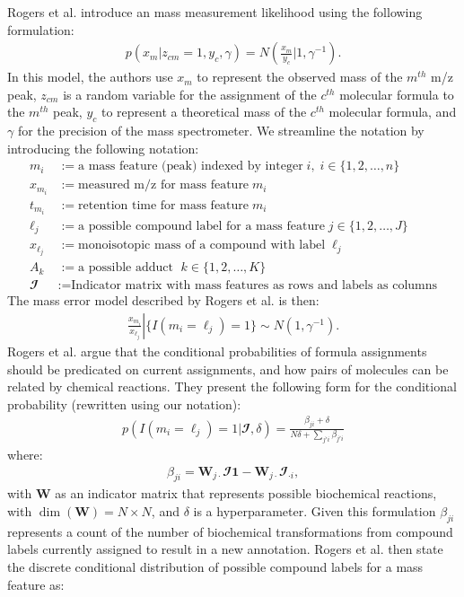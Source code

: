 \begin{DoubleSpace*}
Rogers et al. introduce an mass measurement likelihood using the following formulation:
\begin{align}
	p(x_m|z_{cm}=1,y_c,\gamma)=N\left(\frac{x_m}{y_c}|1,\gamma^{-1} \right).
\end{align}
In this model, the authors use $x_m$ to represent the observed mass of the $m^{th}$ m/z peak, $z_{cm}$ is a random variable for the assignment of the $c^{th}$ molecular formula to the $m^{th}$ peak, $y_c$ to represent a theoretical mass of the $c^{th}$ molecular formula, and $\gamma$ for the precision of the mass spectrometer. We streamline the notation by introducing the following notation:
\begin{align*}
m_i &:=\text{a mass feature (peak) indexed by integer}\; i, \; i \in \{1,2,\hdots,n \} \\
x_{m_i} &:= \text{measured m/z for mass feature}\; m_i \\
t_{m_i} &:= \text{retention time for mass feature}\; m_i \\
\ell_j &:= \text{a possible compound label for a mass feature}\; j\in\{1, 2, \hdots, J\} \\
x_{\ell_j} &:= \text{monoisotopic mass of a compound with label}\; \ell_j \\
A_k &:= \text{a possible adduct } \; k\in\{1, 2, \hdots, K\} \\
\mathbfcal{I} &:= \text{Indicator matrix with mass features as rows and labels as columns}
\end{align*} 
The mass error model described by Rogers et al. is then:
\begin{align}
	\left. \frac{x_{m_i}}{x_{\ell_j}} \right| \{ I(m_i=\ell_j )=1 \} \sim N\left(1, \gamma^{-1}\right).
\end{align}
Rogers et al. argue that the conditional probabilities of formula assignments should be predicated on current assignments, and how pairs of molecules can be related by chemical reactions. They present the following form for the conditional probability (rewritten using our notation):
\begin{align}
p( I(m_i=\ell_j )=1|\mathbfcal{I},\delta) =  \frac{\beta_{ji}+\delta}{N\delta+\sum_{j'i} \beta_{j'i}}
\end{align}
where:
\begin{align}
	\beta_{ji}=\textbf{W}_{j \cdot} \mathbfcal{I} \textbf{1} - \textbf{W}_{j \cdot} \mathbfcal{I}_{\cdot i}, 
\end{align}
with $\textbf{W}$ as an indicator matrix that represents possible biochemical reactions, with $\dim(\textbf{W})=N\times N$, and $\delta$ is a hyperparameter. Given this formulation $\beta_{ji}$ represents a count of the number of biochemical transformations from compound labels currently assigned to result in a new annotation. Rogers et al. then state the discrete conditional distribution of possible compound labels for a mass feature as:

\end{DoubleSpace*}
